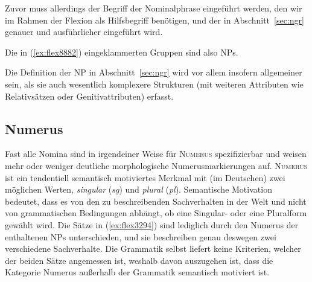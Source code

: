 Zuvor muss allerdings der Begriff der Nominalphrase eingeführt werden, den wir im Rahmen der Flexion als Hilfsbegriff benötigen, und der in Abschnitt~\ref{sec:ngr} genauer und ausführlicher eingeführt wird.



Die in (\ref{ex:flex8882}) eingeklammerten Gruppen sind also NPs.

\begin{exe}
  \ex\label{ex:flex8882}
  \begin{xlist}
  \end{xlist}
\end{exe}

Die Definition der NP in Abschnitt~\ref{sec:ngr} wird vor allem insofern allgemeiner sein, als sie auch wesentlich komplexere Strukturen (mit weiteren Attributen wie \zB Relativsätzen oder Genitivattributen) erfasst.

\subsection{Numerus}

\label{sec:numerus}


Fast alle Nomina sind in irgendeiner Weise für \textsc{Numerus} spezifizierbar und weisen mehr oder weniger deutliche morphologische Numerusmarkierungen auf.
\textsc{Numerus} ist ein tendentiell semantisch motiviertes Merkmal mit (im Deutschen) zwei möglichen Werten, \textit{singular} (\textit{sg}) und \textit{plural} (\textit{pl}).
Semantische Motivation bedeutet, dass es von den zu beschreibenden Sachverhalten in der Welt und nicht von grammatischen Bedingungen abhängt, ob eine Singular- oder eine Pluralform gewählt wird.
Die Sätze in (\ref{ex:flex3294}) sind lediglich durch den Numerus der enthaltenen NPs unterschieden, und sie beschreiben genau deswegen zwei verschiedene Sachverhalte.
Die Grammatik selbst liefert keine Kriterien, welcher der beiden Sätze angemessen ist, weshalb davon auszugehen ist, dass die Kategorie Numerus außerhalb der Grammatik semantisch motiviert ist.

